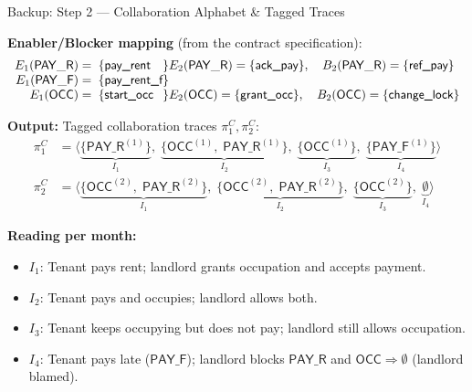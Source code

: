 \documentclass[9pt,aspectratio=169]{beamer}
\newcommand{\PAY}{\ensuremath{\mathsf{PAY\_R}}\xspace}
\newcommand{\PAYF}{\ensuremath{\mathsf{PAY\_F}}\xspace}
\newcommand{\OCC}{\ensuremath{\mathsf{OCC}}\xspace}
\begin{document}
\begin{frame}{Backup: Step 2 — Collaboration Alphabet \& Tagged Traces}
\small

\textbf{Enabler/Blocker mapping} (from the contract specification):
\begingroup\footnotesize
\[
\begin{array}{r@{\;=\;\{}l@{\}}l}
E_1(\PAY) & \textsf{pay\_rent}   & E_2(\PAY) = \{\textsf{ack\_pay}\},\quad B_2(\PAY) = \{\textsf{ref\_pay}\}\\
E_1(\PAYF) & \textsf{pay\_rent\_f} & \\
E_1(\OCC) & \textsf{start\_occ}  & E_2(\OCC) = \{\textsf{grant\_occ}\},\quad B_2(\OCC) = \{\textsf{change\_lock}\}
\end{array}
\]
\endgroup

\begin{center}
\end{center}

\textbf{Output:} Tagged collaboration traces $\pi_1^C, \pi_2^C$:
\begingroup\footnotesize
\[
\begin{aligned}
\pi_1^C &= \langle
  \underbrace{\{\PAY^{(1)}\}}_{I_1},\;
  \underbrace{\{\OCC^{(1)},\;\PAY^{(1)}\}}_{I_2},\;
  \underbrace{\{\OCC^{(1)}\}}_{I_3},\;
  \underbrace{\{\PAYF^{(1)}\}}_{I_4}
\rangle\\[3pt]
\pi_2^C &= \langle
  \underbrace{\{\OCC^{(2)},\;\PAY^{(2)}\}}_{I_1},\;
  \underbrace{\{\OCC^{(2)},\;\PAY^{(2)}\}}_{I_2},\;
  \underbrace{\{\OCC^{(2)}\}}_{I_3},\;
  \underbrace{\emptyset}_{I_4}
\rangle
\end{aligned}
\]
\endgroup

\vspace{1mm}
\textbf{Reading per month:}
\begin{itemize}\setlength\itemsep{1pt}
  \item $I_1$: Tenant pays rent; landlord grants occupation and accepts payment.
  \item $I_2$: Tenant pays and occupies; landlord allows both.
  \item $I_3$: Tenant keeps occupying but does not pay; landlord still allows occupation.
  \item $I_4$: Tenant pays late (\PAYF); \textcolor{ConflictRed}{landlord blocks \PAY and \OCC $\Rightarrow \emptyset$ (landlord blamed)}.
\end{itemize}
\end{frame}
\end{document}

